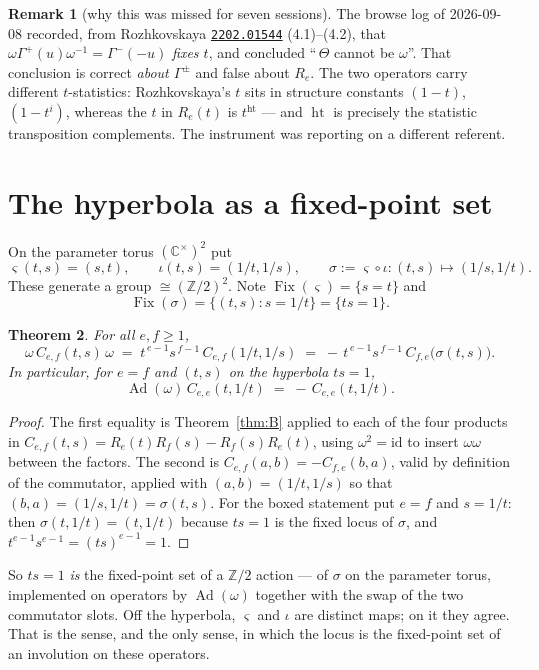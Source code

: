 \documentclass[11pt]{article}
\newtheorem{theorem}{Theorem}
\theoremstyle{definition}
\newtheorem{remark}[theorem]{Remark}
\newcommand{\hgt}{\operatorname{ht}}   %
\newcommand{\Z}{\mathbb{Z}}
\newcommand{\C}{\mathbb{C}}
\newcommand{\Ad}{\operatorname{Ad}}
\begin{document}
\begin{remark}[why this was missed for seven sessions]
The browse log of 2026-09-08 recorded, from Rozhkovskaya
\href{https://arxiv.org/abs/2202.01544}{\texttt{2202.01544}} (4.1)--(4.2), that
$\omega\Gamma^+(u)\omega^{-1}=\Gamma^-(-u)$ \emph{fixes $t$}, and concluded
``\,$\Theta$ cannot be $\omega$''.  That conclusion is correct \emph{about
$\Gamma^\pm$} and false about $R_e$.  The two operators carry different $t$-statistics:
Rozhkovskaya's $t$ sits in structure constants $(1-t)$, $(1-t^i)$, whereas the $t$ in
$R_e(t)$ is $t^{\hgt}$ --- and $\hgt$ is precisely the statistic transposition
complements.  The instrument was reporting on a different referent.
\end{remark}

\section{The hyperbola as a fixed-point set}

On the parameter torus $(\C^\times)^2$ put
\[
  \varsigma(t,s)=(s,t),\qquad \iota(t,s)=(1/t,1/s),\qquad
  \sigma:=\varsigma\circ\iota:(t,s)\mapsto(1/s,1/t).
\]
These generate a group $\cong(\Z/2)^2$.  Note
$\operatorname{Fix}(\varsigma)=\{s=t\}$ and
\[
  \operatorname{Fix}(\sigma)=\{(t,s):s=1/t\}=\{ts=1\}.
\]

\begin{theorem}\label{thm:C}
For all $e,f\ge1$,
\[
  \omega\,C_{e,f}(t,s)\,\omega\;=\;t^{\,e-1}s^{\,f-1}\,C_{e,f}(1/t,1/s)
  \;=\;-\,t^{\,e-1}s^{\,f-1}\,C_{f,e}\bigl(\sigma(t,s)\bigr).
\]
In particular, for $e=f$ and $(t,s)$ on the hyperbola $ts=1$,
\[
  \boxed{\ \Ad(\omega)\,C_{e,e}(t,1/t)\;=\;-\,C_{e,e}(t,1/t).\ }
\]
\end{theorem}

\begin{proof}
The first equality is Theorem~\ref{thm:B} applied to each of the four products in
$C_{e,f}(t,s)=R_e(t)R_f(s)-R_f(s)R_e(t)$, using $\omega^2=\mathrm{id}$ to insert
$\omega\omega$ between the factors.  The second is
$C_{e,f}(a,b)=-C_{f,e}(b,a)$, valid by definition of the commutator, applied with
$(a,b)=(1/t,1/s)$ so that $(b,a)=(1/s,1/t)=\sigma(t,s)$.  For the boxed statement put
$e=f$ and $s=1/t$: then $\sigma(t,1/t)=(t,1/t)$ because $ts=1$ is the fixed locus of
$\sigma$, and $t^{e-1}s^{e-1}=(ts)^{e-1}=1$.
\end{proof}

So $ts=1$ \emph{is} the fixed-point set of a $\Z/2$ action --- of $\sigma$ on the
parameter torus, implemented on operators by $\Ad(\omega)$ together with the swap of
the two commutator slots.  Off the hyperbola, $\varsigma$ and $\iota$ are distinct
maps; on it they agree.  That is the sense, and the only sense, in which the locus is
the fixed-point set of an involution on these operators.
\end{document}
